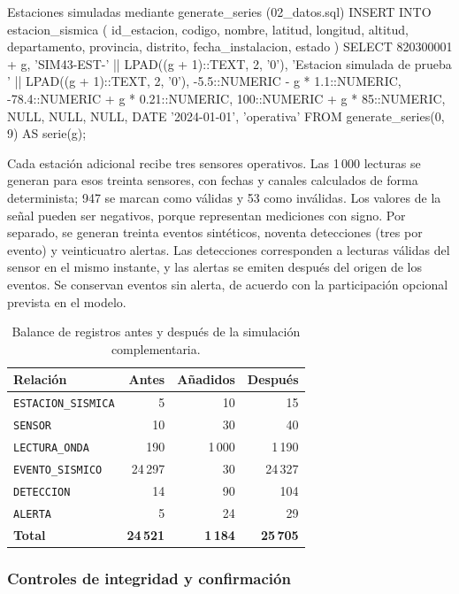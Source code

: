\documentclass[12pt,a4paper]{article}
\begin{document}
\begin{sqlbloque}{Estaciones simuladas mediante generate\_series (02\_datos.sql)}
INSERT INTO estacion_sismica (
    id_estacion, codigo, nombre, latitud, longitud, altitud,
    departamento, provincia, distrito, fecha_instalacion, estado
)
SELECT
    820300001 + g,
    'SIM43-EST-' || LPAD((g + 1)::TEXT, 2, '0'),
    'Estacion simulada de prueba ' || LPAD((g + 1)::TEXT, 2, '0'),
    -5.5::NUMERIC - g * 1.1::NUMERIC,
    -78.4::NUMERIC + g * 0.21::NUMERIC,
    100::NUMERIC + g * 85::NUMERIC,
    NULL, NULL, NULL, DATE '2024-01-01', 'operativa'
FROM generate_series(0, 9) AS serie(g);
\end{sqlbloque}

Cada estación adicional recibe tres sensores operativos. Las 1\,000
lecturas se generan para esos treinta sensores, con fechas y canales
calculados de forma determinista; 947 se marcan como válidas y 53 como
inválidas. Los valores de la señal pueden ser negativos, porque
representan mediciones con signo. Por separado, se generan treinta
eventos sintéticos, noventa detecciones (tres por evento) y
veinticuatro alertas. Las detecciones corresponden a lecturas válidas
del sensor en el mismo instante, y las alertas se emiten después del
origen de los eventos. Se conservan eventos sin alerta, de acuerdo con
la participación opcional prevista en el modelo.

\begin{table}[H]
\centering\small
\begin{tabular}{p{5.3cm}rrr}
\toprule
\textbf{Relación} & \textbf{Antes} & \textbf{Añadidos} & \textbf{Después} \\
\midrule
\texttt{ESTACION\_SISMICA} & 5 & 10 & 15 \\
\texttt{SENSOR} & 10 & 30 & 40 \\
\texttt{LECTURA\_ONDA} & 190 & 1\,000 & 1\,190 \\
\texttt{EVENTO\_SISMICO} & 24\,297 & 30 & 24\,327 \\
\texttt{DETECCION} & 14 & 90 & 104 \\
\texttt{ALERTA} & 5 & 24 & 29 \\
\midrule
\textbf{Total} & \textbf{24\,521} & \textbf{1\,184} & \textbf{25\,705} \\
\bottomrule
\end{tabular}
\caption{Balance de registros antes y después de la simulación complementaria.}
\label{tab:volumen-simulado-43}
\end{table}

\subsubsection*{Controles de integridad y confirmación}
\end{document}

